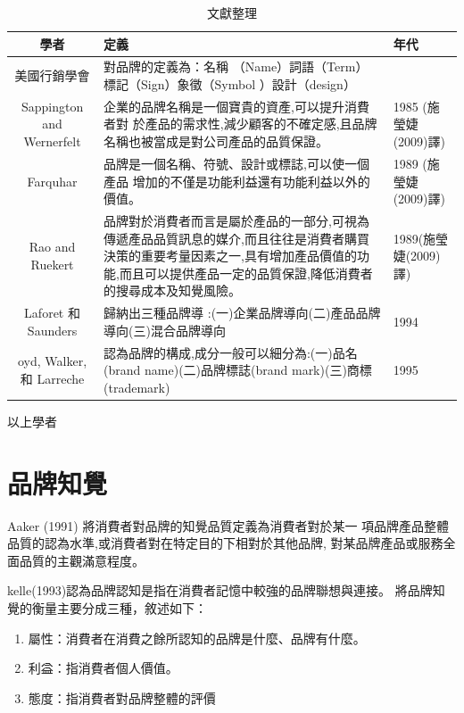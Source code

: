 \begin{table}[htb]
\caption{文獻整理}
\label{tab:PL1}
\centering
%
\begin{tabular}[t]{|c|p{8.5cm}|p{2.5cm}|} %
\hline
學者&定義 & 年代 \tabularnewline
\hline
美國行銷學會 & 對品牌的定義為：名稱 （Name）詞語（Term） 標記（Sign）象徵（Symbol ）設計（design）&  \tabularnewline
\hline
Sappington and Wernerfelt  &企業的品牌名稱是一個寶貴的資產,可以提升消費者對
於產品的需求性,減少顧客的不確定感,且品牌名稱也被當成是對公司產品的品質保證。& 1985 (施瑩婕(2009)譯) \tabularnewline
\hline
Farquhar &品牌是一個名稱、符號、設計或標誌,可以使一個產品
增加的不僅是功能利益還有功能利益以外的價值。&1989 (施瑩婕(2009)譯) \tabularnewline
\hline
Rao and Ruekert &品牌對於消費者而言是屬於產品的一部分,可視為傳遞產品品質訊息的媒介,而且往往是消費者購買決策的重要考量因素之一,具有增加產品價值的功能,而且可以提供產品一定的品質保證,降低消費者的搜尋成本及知覺風險。&1989(施瑩婕(2009)譯)  \tabularnewline
\hline
 Laforet 和 Saunders&歸納出三種品牌導 :(一)企業品牌導向(二)產品品牌導向(三)混合品牌導向
&1994\tabularnewline
\hline
oyd, Walker, 和 Larreche&認為品牌的構成,成分一般可以細分為:(一)品名(brand name)(二)品牌標誌(brand mark)(三)商標(trademark)&1995\tabularnewline
\hline
\end{tabular}
\end{table}

以上學者

\section{品牌知覺}
Aaker (1991) \cite{Aaker1991}將消費者對品牌的知覺品質定義為消費者對於某一 項品牌產品整體品質的認為水準,或消費者對在特定目的下相對於其他品牌, 對某品牌產品或服務全面品質的主觀滿意程度。

kelle(1993)\cite{Keller1993}認為品牌認知是指在消費者記憶中較強的品牌聯想與連接。
將品牌知覺的衡量主要分成三種，敘述如下：
\begin{enumerate}
\item 屬性：消費者在消費之餘所認知的品牌是什麼、品牌有什麼。
\item 利益：指消費者個人價值。
\item 態度：指消費者對品牌整體的評價
\end{enumerate}


